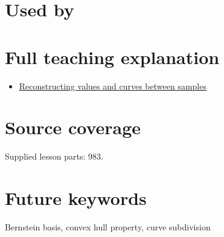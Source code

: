 \section{Used by}\label{appendix-ddbec701898c-used-by}

\section{Full teaching explanation}\label{appendix-ddbec701898c-full-teaching-explanation}

\begin{itemize}
\tightlist
\item
  \href{Continuous\%20Notes/Computing\%20Foundations\%20-\%20From\%20Bits\%20to\%20C++\%20and\%20Systems\%20APIs\#Reconstructing\%20values\%20and\%20curves\%20between\%20samples}{Reconstructing values and curves between samples}
\end{itemize}

\section{Source coverage}\label{appendix-ddbec701898c-source-coverage}

Supplied lesson parts: 983.

\section{Future keywords}\label{appendix-ddbec701898c-future-keywords}

Bernstein basis, convex hull property, curve subdivision
